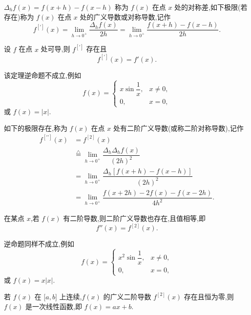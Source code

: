 \documentclass[../数学分析培优讲义.tex]{subfiles}
\begin{document}
\begin{definition}
$\Delta_hf(x)=f(x+h)-f(x-h)$ 称为 $f(x)$ 在点 $x$ 处的对称差,如下极限(若存在)称为 $f(x)$ 在点 $x$ 处的广义导数或对称导数,记作
\[
    f^{[\prime]}(x)
    =\lim\limits_{h\to0^+}\dfrac{\Delta_hf(x)}{2h}
    =\lim\limits_{h\to0^+}\dfrac{f(x+h)-f(x-h)}{2h}.
\]
\end{definition}

\begin{theorem}[\markstar]
设 $f$ 在点 $x$ 处可导,则 $f^{[\prime]}$ 存在且
\[
    f^{[\prime]}(x)=f'(x).
\]
\end{theorem}

\begin{remark}
该定理逆命题不成立,例如
\[
f(x)=
\begin{cases}
    x\sin\dfrac{1}{x}, & x\neq0,\\
    0, & x=0,
\end{cases}
\]
或 $f(x)=|x|$.
\end{remark}

\begin{definition}
如下的极限存在,称为 $f(x)$ 在点 $x$ 处有二阶广义导数(或称二阶对称导数),记作
\[
\begin{aligned}
    f^{[\prime\prime]}(x)
    &=f^{[2]}(x)\\
    &\overset{\triangle}{=}
    \lim\limits_{h\to0^+}\dfrac{\Delta_h\Delta_hf(x)}{(2h)^2}\\
    &=\lim\limits_{h\to0^+}
    \dfrac{\Delta_h[f(x+h)-f(x-h)]}{(2h)^2}\\
    &=\lim\limits_{h\to0^+}
    \dfrac{f(x+2h)-2f(x)-f(x-2h)}{4h^2}.
\end{aligned}
\]
\end{definition}

\begin{theorem}[\markstar]
在某点 $x$,若 $f(x)$ 有二阶导数,则二阶广义导数也存在,且值相等,即
\[
    f''(x)=f^{[2]}(x).
\]
\end{theorem}

\begin{remark}
逆命题同样不成立,例如
\[
f(x)=
\begin{cases}
    x^2\sin\dfrac{1}{x}, & x\neq0,\\
    0, & x=0,
\end{cases}
\]
或 $f(x)=x|x|$.
\end{remark}

\begin{example}
若 $f(x)$ 在 $\lbrack a,b\rbrack$ 上连续,$f(x)$ 的广义二阶导数 $f^{[2]}(x)$ 存在且恒为零,则 $f(x)$ 是一次线性函数,即 $f(x)=ax+b$.
\end{example}
\exampleblank
\end{document}
